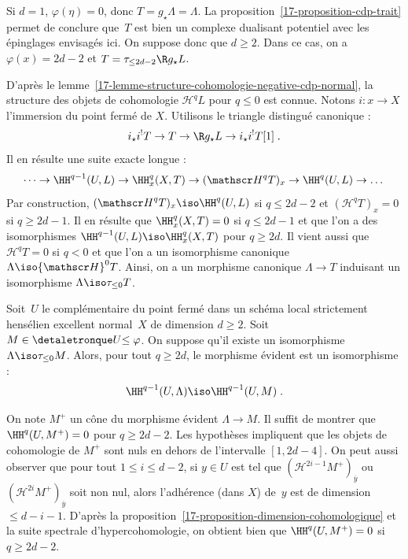 \documentclass[10pt]{../fichiers-configuration-latex/smfart}
\begin{document}
Si $d=1$, $\varphi(\eta)=0$, donc $T=g_\star\Lambda=\Lambda$. La
proposition~\ref{17-proposition-cdp-trait} permet de conclure que $T$ est bien
un complexe dualisant potentiel avec les épinglages envisagés ici. On
suppose donc que $d\geq 2$. Dans ce cas, on a $\varphi(x)=2d-2$ et
$T=\tau_{\leq 2d-2}\R g_\star L$.

D'après le lemme~\ref{17-lemme-structure-cohomologie-negative-cdp-normal}, la
structure des objets de cohomologie ${\mathscr H}^q L$ pour $q\leq 0$ est
connue. Notons $i\colon x\to X$ l'immersion du point fermé de $X$.
Utilisons le triangle distingué canonique :
\[i_\star i^! T\to T\to \R g_\star L\to i_\star i^!T[1]\;\text{.}\]
Il en résulte une suite exacte longue :
\[\dots \to \HH^{q-1}(U,L)\to \HH^q_x(X,T)\to
({\mathscr H}^qT)_x \to \HH^q(U,L)\to \dots\]
Par construction, $({\mathscr H}^q T)_x\iso \HH^q(U,L)$ si $q\leq 2d-2$ et 
$({\mathscr H}^q T)_x=0$ si $q\geq 2d-1$. Il en résulte que $\HH^q_x(X,T)=0$
si $q\leq 2d-1$ et que l'on a des isomorphismes $\HH^{q-1}(U,L)\iso
\HH^q_x(X,T)$ pour $q\geq 2d$.
Il vient aussi que ${\mathscr H}^q T=0$ si $q<0$ et que l'on a un
isomorphisme canonique $\Lambda\iso {\mathscr H}^0T$. Ainsi, on a un
morphisme canonique
$\Lambda \to T$ induisant un isomorphisme $\Lambda\iso
\tau_{\leq 0}T$.

\begin{lemme2}\label{17-lemme-technique-dimcohom-existence-unicite-cdp}
Soit $U$ le complémentaire du point fermé dans un schéma local strictement
hensélien excellent normal $X$ de dimension $d\geq 2$.
Soit $M\in\detaletronque U {\leq \varphi}$. On suppose qu'il existe un isomorphisme 
$\Lambda\iso \tau_{\leq 0}M$. Alors, pour tout $q\geq 2d$, le morphisme
évident est un isomorphisme :
\[\HH^{q-1}(U,\Lambda)\iso \HH^{q-1}(U,M)\;\text{.}\]
\end{lemme2}

On note $M^+$ un cône du morphisme évident $\Lambda\to M$. Il suffit de
montrer que $\HH^q(U,M^+)=0$ pour $q\geq 2d-2$. Les hypothèses
impliquent que les objets de cohomologie de $M^+$ sont nuls en dehors
de l'intervalle $[1,2d-4]$. On peut aussi observer que pour tout 
$1\leq i\leq d-2$, si $y\in U$ est tel que $({\mathscr
H}^{2i-1} M^+)_{\overline y}$ ou $({\mathscr H}^{2i} M^+)_{\overline y}$
soit non nul,
alors l'adhérence (dans $X$) de $y$ est de dimension $\leq d-i-1$.
D'après la proposition~\ref{17-proposition-dimension-cohomologique} et la
suite spectrale d'hypercohomologie, on obtient bien que $\HH^q(U,M^+)=0$ si
$q\geq 2d-2$.
\end{document}
